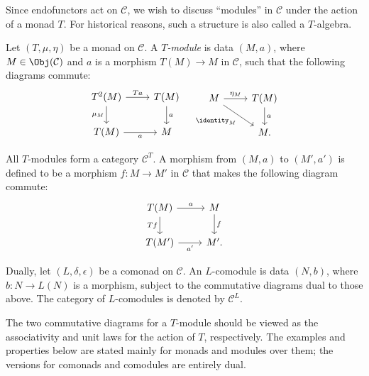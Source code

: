 Since endofunctors act on $\mathcal{C}$, we wish to discuss ``modules'' in
$\mathcal{C}$ under the action of a monad $T$. For historical reasons, such
a structure is also called a $T$-algebra.

\begin{definition}\label{def:T-Alg}
	Let $(T,\mu,\eta)$ be a monad on $\mathcal{C}$. A \emph{$T$-module} is
	data $(M,a)$, where $M\in\Obj(\mathcal{C})$ and $a$ is a morphism
	$T(M)\to M$ in $\mathcal{C}$, such that the following diagrams commute:
	\[\begin{tikzcd}
		T^2 (M) \arrow[r, "Ta"] \arrow[d, "\mu_M"'] & T(M) \arrow[d, "a"] \\
		T(M) \arrow[r, "a"'] & M
	\end{tikzcd} \quad \begin{tikzcd}
		M \arrow[r, "\eta_M"] \arrow[rd, "{\identity_M}"'] & T(M) \arrow[d, "a"] \\
		& M .
	\end{tikzcd}\]

	All $T$-modules form a category $\mathcal{C}^T$. A morphism from $(M,a)$
	to $(M',a')$ is defined to be a morphism $f:M\to M'$ in $\mathcal{C}$
	that makes the following diagram commute:
	\[\begin{tikzcd}
		T(M) \arrow[r, "a"] \arrow[d, "Tf"'] & M \arrow[d, "f"] \\
		T(M')  \arrow[r, "{a'}"'] & M' .
	\end{tikzcd}\]

	Dually, let $(L,\delta,\epsilon)$ be a comonad on $\mathcal{C}$. An
	$L$-comodule is data $(N,b)$, where $b:N\to L(N)$ is a morphism, subject
	to the commutative diagrams dual to those above. The category of
	$L$-comodules is denoted by $\mathcal{C}^L$.
\end{definition}

The two commutative diagrams for a $T$-module should be viewed as the
associativity and unit laws for the action of $T$, respectively. The examples
and properties below are stated mainly for monads and modules over them; the
versions for comonads and comodules are entirely dual.

